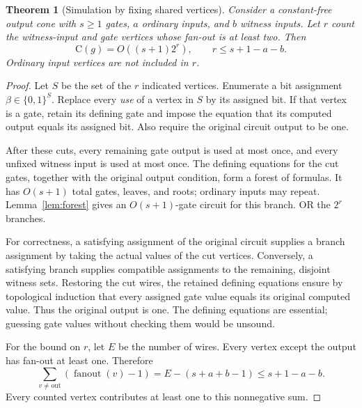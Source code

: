 \documentclass[11pt]{article}
\newtheorem{theorem}{Theorem}[section]
\theoremstyle{definition}
\theoremstyle{remark}
\newcommand{\B}{\{0,1\}}
\newcommand{\C}{\mathrm{C}}
\DeclareMathOperator{\fanout}{fanout}
\begin{document}
\begin{theorem}[Simulation by fixing shared vertices]\label{thm:cut}
Consider a constant-free output cone with $s\ge1$ gates, $a$ ordinary
inputs, and $b$ witness inputs. Let $r$ count the witness-input and
gate vertices whose fan-out is at least two. Then
\begin{equation}\label{eq:cut}
 \C(g)=O((s+1)2^r),
 \qquad r\le s+1-a-b.
\end{equation}
Ordinary input vertices are not included in $r$.
\end{theorem}
\begin{proof}
Let $S$ be the set of the $r$ indicated vertices. Enumerate a bit
assignment $\beta\in\B^S$. Replace every \emph{use} of a vertex in
$S$ by its assigned bit. If that vertex is a gate, retain its defining
gate and impose the equation that its computed output equals its
assigned bit. Also require the original circuit output to be one.

After these cuts, every remaining gate output is used at most once,
and every unfixed witness input is used at most once. The defining
equations for the cut gates, together with the original output
condition, form a forest of formulas. It has $O(s+1)$ total gates,
leaves, and roots; ordinary inputs may repeat. Lemma~\ref{lem:forest}
gives an $O(s+1)$-gate circuit for this branch. OR the $2^r$ branches.

For correctness, a satisfying assignment of the original circuit
supplies a branch assignment by taking the actual values of the cut
vertices. Conversely, a satisfying branch supplies compatible
assignments to the remaining, disjoint witness sets. Restoring the cut
wires, the retained defining equations ensure by topological induction
that every assigned gate value equals its original computed value.
Thus the original output is one. The defining equations are essential;
guessing gate values without checking them would be unsound.

For the bound on $r$, let $E$ be the number of wires. Every vertex
except the output has fan-out at least one. Therefore
\[
 \sum_{v\ne\mathrm{out}}(\fanout(v)-1)
     =E-(s+a+b-1)\le s+1-a-b.
\]
Every counted vertex contributes at least one to this nonnegative sum.
\end{proof}
\end{document}
